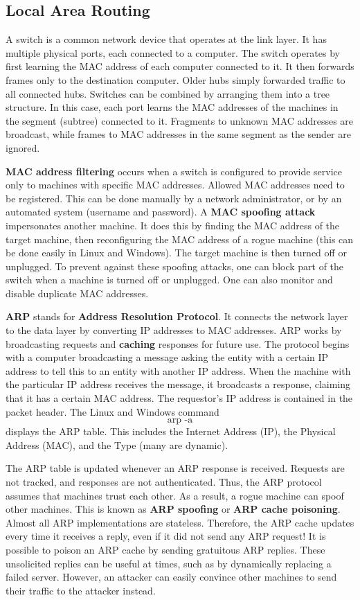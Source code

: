 \documentclass[11pt]{article}
\theoremstyle{plain} %
\theoremstyle{definition}
\theoremstyle{example}
\theoremstyle{remark}
\begin{document}
\subsection{Local Area Routing}
A switch is a common network device that operates at the link layer. It has multiple physical ports, each connected to a computer. The switch operates by first learning the MAC address of each computer connected to it. It then forwards frames only to the destination computer. Older hubs simply forwarded traffic to all connected hubs. Switches can be combined by arranging them into a tree structure. In this case, each port learns the MAC addresses of the machines in the segment (subtree) connected to it. Fragments to unknown MAC addresses are broadcast, while frames to MAC addresses in the same segment as the sender are ignored. 

\textbf{MAC address filtering} occurs when a switch is configured to provide service only to machines with specific MAC addresses. Allowed MAC addresses need to be registered. This can be done manually by a network administrator, or by an automated system (username and password). A \textbf{MAC spoofing attack} impersonates another machine. It does this by finding the MAC address of the target machine, then reconfiguring the MAC address of a rogue machine (this can be done easily in Linux and Windows). The target machine is then turned off or unplugged. To prevent against these spoofing attacks, one can block part of the switch when a machine is turned off or unplugged. One can also monitor and disable duplicate MAC addresses. 

\textbf{ARP} stands for \textbf{Address Resolution Protocol}. It connects the network layer to the data layer by converting IP addresses to MAC addresses. ARP works by broadcasting requests and \textbf{caching} responses for future use. The protocol begins with a computer broadcasting a message asking the entity with a certain IP address to tell this to an entity with another IP address. When the machine with the particular IP address receives the message, it broadcasts a response, claiming that it has a certain MAC address. The requestor's IP address is contained in the packet header. The Linux and Windows command $$\text{arp -a}$$
displays the ARP table. This includes the Internet Address (IP), the Physical Address (MAC), and the Type (many are dynamic). 

The ARP table is updated whenever an ARP response is received. Requests are not tracked, and responses are not authenticated. Thus, the ARP protocol assumes that machines trust each other. As a result, a rogue machine can spoof other machines. This is known as \textbf{ARP spoofing} or \textbf{ARP cache poisoning}. Almost all ARP implementations are stateless. Therefore, the ARP cache updates every time it receives a reply, even if it did not send any ARP request! It is possible to poison an ARP cache by sending gratuitous ARP replies. These unsolicited replies can be useful at times, such as by dynamically replacing a failed server. However, an attacker can easily convince other machines to send their traffic to the attacker instead. 
\end{document}
